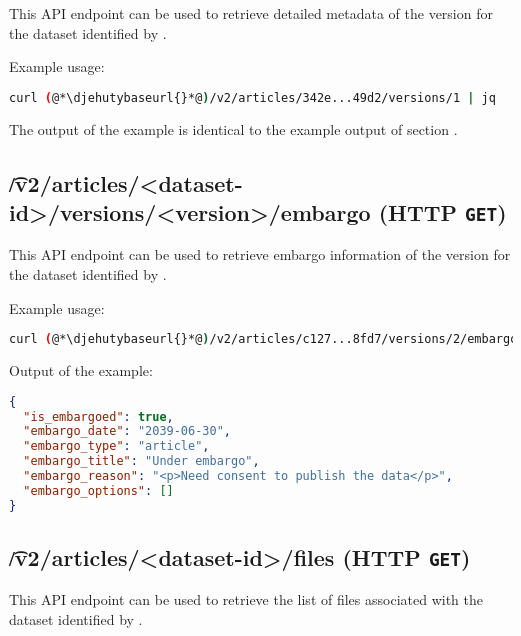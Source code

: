   This API endpoint can be used to retrieve detailed metadata of the version
   for the dataset identified by .

  Example usage:
\begin{lstlisting}[language=bash]
curl (@*\djehutybaseurl{}*@)/v2/articles/342e...49d2/versions/1 | jq
\end{lstlisting}

  The output of the example is identical to the example output of section
  .

\subsection{\t{/v2/articles/<dataset-id>/versions/<version>/embargo} (HTTP \texttt{GET})}

  This API endpoint can be used to retrieve embargo information of the version
   for the dataset identified by .

  Example usage:
\begin{lstlisting}[language=bash]
curl (@*\djehutybaseurl{}*@)/v2/articles/c127...8fd7/versions/2/embargo | jq
\end{lstlisting}

  Output of the example:
\begin{lstlisting}[language=JSON]
{
  "is_embargoed": true,
  "embargo_date": "2039-06-30",
  "embargo_type": "article",
  "embargo_title": "Under embargo",
  "embargo_reason": "<p>Need consent to publish the data</p>",
  "embargo_options": []
}
\end{lstlisting}


\subsection{\t{/v2/articles/<dataset-id>/files} (HTTP \texttt{GET})}

  This API endpoint can be used to retrieve the list of files associated with
  the dataset identified by .

